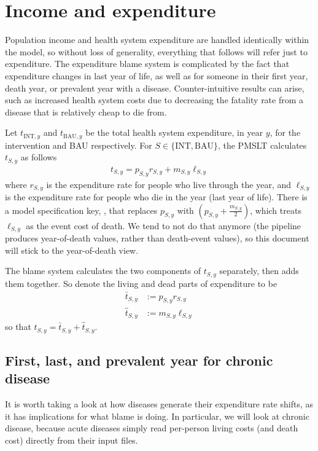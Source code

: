 \documentclass[]{article}
\begin{document}
\section{Income and expenditure}

Population income and health system expenditure are handled identically within the model, so without loss of generality, everything that follows will refer just to expenditure. The expenditure blame system is complicated by the fact that expenditure changes in last year of life, as well as for someone in their first year, death year, or prevalent year with a disease. Counter-intuitive results can arise, such as increased health system costs due to decreasing the fatality rate from a disease that is relatively cheap to die from.

Let $t_{\text{INT}, y}$ and $t_{\text{BAU}, y}$ be the total health system expenditure, in year $y$, for the intervention and BAU respectively. For $S \in \{\text{INT}, \text{BAU}\}$, the PMSLT calculates $t_{S, y}$ as follows
\begin{align*}
	t_{S, y} = p_{S, y} r_{S, y} + m_{S, y} \ell_{S, y}
\end{align*}
where $r_{S, y}$ is the expenditure rate for people who live through the year, and $\ell_{S, y}$ is the expenditure rate for people who die in the year (last year of life). There is a model specification key, , that replaces $p_{S, y}$ with $\left(p_{S, y} + \frac{m_{S, y}}{2}\right)$, which treats $\ell_{S, y}$ as the event cost of death. We tend to not do that anymore (the pipeline produces year-of-death values, rather than death-event values), so this document will stick to the year-of-death view.

The blame system calculates the two components of $t_{S, y}$ separately, then adds them together. So denote the living and dead parts of expenditure to be
\begin{align*}
	\bar{t}_{S, y} &:= p_{S, y} r_{S, y} \\
	\widehat{t}_{S, y} &:= m_{S, y} \ell_{S, y}
\end{align*}
so that $t_{S, y} = \bar{t}_{S, y} + \widehat{t}_{S, y}$.

\subsection{First, last, and prevalent year for chronic disease}

It is worth taking a look at how diseases generate their expenditure rate shifts, as it has implications for what blame is doing. In particular, we will look at chronic disease, because acute diseases simply read per-person living costs (and death cost) directly from their input files.
\end{document}
